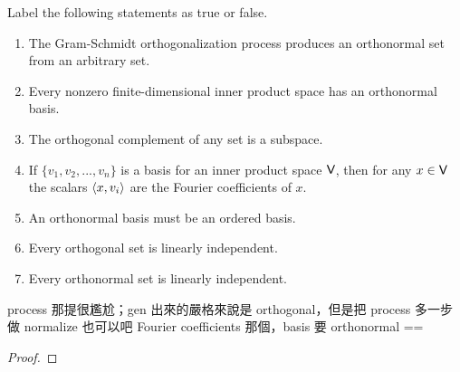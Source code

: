 \exercisesection

\begin{exercise} \label{exercise 6.2.1}
Label the following statements as true or false.
\begin{enumerate}
\item The Gram-Schmidt orthogonalization process produces an orthonormal set from an arbitrary \emph{\LID{}} set.
\item Every nonzero finite-dimensional inner product space has an orthonormal basis.
\item The orthogonal complement of any set is a subspace.
\item If \(\{ v_1, v_2, ..., v_n \}\) is a basis for an inner product space \(\textsf{V}\), then for any \(x \in \textsf{V}\) the scalars \(\left< x, v_i \right>\) are the Fourier coefficients of \(x\).
\item An orthonormal basis must be an ordered basis.
\item Every orthogonal set is linearly independent.
\item Every orthonormal set is linearly independent.
\end{enumerate}
process 那提很尷尬；gen 出來的嚴格來說是 orthogonal，但是把 process 多一步做 normalize 也可以吧
Fourier coefficients 那個，basis 要 orthonormal ==
\end{exercise}

\begin{proof}
\end{proof}

